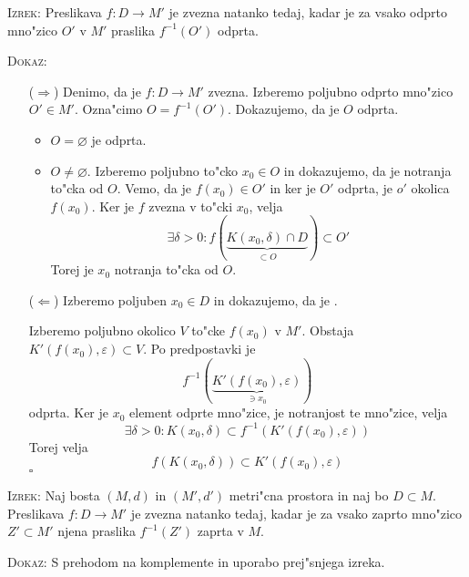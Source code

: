 \textsc{Izrek:} Preslikava $f: D \to M'$ je zvezna natanko tedaj, kadar je za vsako odprto mno"zico $O'$ v $M'$ praslika $f^{-1} (O')$ odprta.

\textsc{Dokaz:}
\begin{itemize}
    \item[($\Rightarrow$)] Denimo, da je $f: D \to M'$ zvezna. Izberemo poljubno odprto mno"zico $O' \in M'$. Ozna"cimo $O = f^{-1}(O')$. Dokazujemo, da je $O$ odprta.
    \begin{itemize}
        \item $O = \varnothing$ je odprta.
        \item $O \neq \varnothing$. Izberemo poljubno to"cko $x_0 \in O$ in dokazujemo, da je notranja to"cka od $O$. Vemo, da je $f(x_0) \in O'$ in ker je $O'$ odprta, je $o'$ okolica $f(x_0)$. Ker je $f$ zvezna v to"cki $x_0$, velja
        \begin{equation*}
        \exists \delta > 0: f(\underbrace{K(x_0, \delta) \cap D}_{\subset O}) \subset O'
        \end{equation*}
        Torej je $x_0$ notranja to"cka od $O$.
    \end{itemize}

    \item[($\Leftarrow$)] Izberemo poljuben $x_0 \in D$ in dokazujemo, da je . 
    
    Izberemo poljubno okolico $V$ to"cke $f(x_0)$ v $M'$. Obstaja $K'(f(x_0), \varepsilon) \subset V$. Po predpostavki je 
    \begin{equation*}
    f^{-1}(\underbrace{K'(f(x_0), \varepsilon)}_{\ni x_0})
    \end{equation*}
    odprta. Ker je $x_0$ element odprte mno"zice, je notranjost te mno"zice, velja
    \begin{equation*}
    \exists \delta > 0: K(x_0, \delta) \subset f^{-1}(K'(f(x_0), \varepsilon))
    \end{equation*}
    Torej velja
    \begin{equation*}
    f(K(x_0, \delta)) \subset K'(f(x_0), \varepsilon)
    \end{equation*}
    \hfill $\square$
\end{itemize}
%
\textsc{Izrek:} Naj bosta $(M, d)$ in $(M', d')$ metri"cna prostora in naj bo $D \subset M$. Preslikava $f: D \to M'$ je zvezna natanko tedaj, kadar je za vsako zaprto mno"zico $Z' \subset M'$ njena praslika $f^{-1}(Z')$ zaprta v $M$.

\textsc{Dokaz:} S prehodom na komplemente in uporabo prej"snjega izreka.

